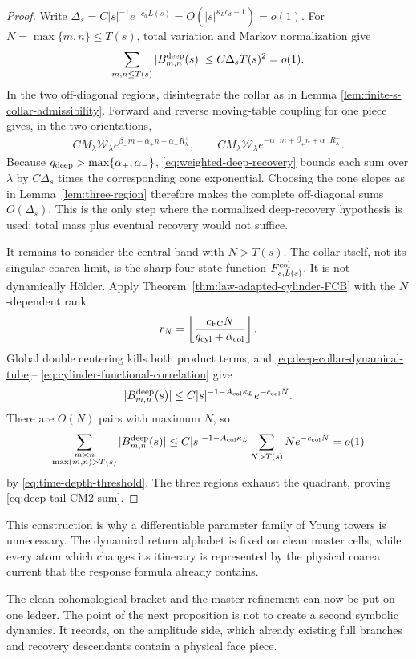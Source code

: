\documentclass[11pt]{article}
\begin{document}
\begin{proof}
Write
$\Delta_s=C|s|^{-1}e^{-c_dL(s)}
=O(|s|^{\kappa_Lc_d-1})=o(1)$.
For $N=\max\{m,n\}\le T(s)$, total variation and Markov normalization give
\[
 \sum_{m,n\le T(s)}|B^{\rm deep}_{m,n}(s)|
 \le C\Delta_sT(s)^2=o(1).
\]
In the two off-diagonal regions, disintegrate the collar as in Lemma
\ref{lem:finite-s-collar-admissibility}.  Forward and reverse moving-table
coupling for one piece gives, in the two orientations,
\begin{align*}
 C M_\lambda\mathcal W_\lambda
 e^{\beta_-m-\alpha_+n+\alpha_+R^+_\lambda},\qquad
 C M_\lambda\mathcal W_\lambda
 e^{-\alpha_-m+\beta_+n+\alpha_-R^-_\lambda}.
\end{align*}
Because $q_{\rm deep}>\max\{\alpha_+,\alpha_-\}$,
\eqref{eq:weighted-deep-recovery} bounds each sum over $\lambda$ by
$C\Delta_s$ times the corresponding cone exponential.  Choosing the cone
slopes as in Lemma~\ref{lem:three-region} therefore makes the complete
off-diagonal sums $O(\Delta_s)$.  This is the only step where the normalized
deep-recovery hypothesis is used; total mass plus eventual recovery would
not suffice.

It remains to consider the central band with $N>T(s)$.  The collar itself,
not its singular coarea limit, is the sharp four-state function
$F_{s,L(s)}^{\rm col}$.  It is not dynamically H\"older.  Apply
Theorem~\ref{thm:law-adapted-cylinder-FCB} with the $N$-dependent rank
\[
 r_N=\left\lfloor
 \frac{c_{\rm FC}N}{q_{\rm cyl}+\alpha_{\rm col}}
 \right\rfloor.
\]
Global double centering kills both product terms, and
\eqref{eq:deep-collar-dynamical-tube}--
\eqref{eq:cylinder-functional-correlation} give
\[
 |B^{\rm deep}_{m,n}(s)|
 \le C|s|^{-1-A_{\rm col}\kappa_L}e^{-c_{\rm col}N}.
\]
There are $O(N)$ pairs with maximum $N$, so
\[
 \sum_{\substack{m\asymp n\\\max(m,n)>T(s)}}
 |B^{\rm deep}_{m,n}(s)|
 \le C|s|^{-1-A_{\rm col}\kappa_L}
       \sum_{N>T(s)}Ne^{-c_{\rm col}N}=o(1)
\]
by \eqref{eq:time-depth-threshold}.  The three regions exhaust the quadrant,
proving \eqref{eq:deep-tail-CM2-sum}.
\end{proof}

This construction is why a differentiable parameter family of Young towers
is unnecessary.  The dynamical return alphabet is fixed on clean master
cells, while every atom which changes its itinerary is represented by the
physical coarea current that the response formula already contains.

The clean cohomological bracket and the master refinement can now be put on one ledger.  The
point of the next proposition is not to create a second symbolic dynamics.
It records, on the amplitude side, which already existing full branches and
recovery descendants contain a physical face piece.
\end{document}
